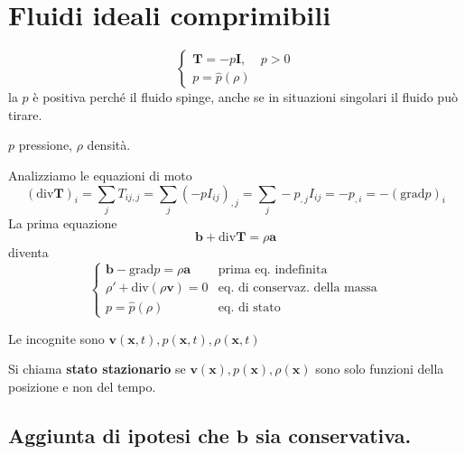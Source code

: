 \documentclass[10pt,a4paper,twoside]{book}
\begin{document}
\section{Fluidi ideali comprimibili}
\begin{equation*}
\boxed{\begin{cases}
\mathbf{T} =-p\mathbf{I} , & p >0\\
p=\hat{p}( \rho ) & 
\end{cases}}
\end{equation*}
la $p$ è positiva perché il fluido spinge, anche se in situazioni singolari il fluido può tirare.

$p$ pressione, $\rho $ densità.



Analizziamo le equazioni di moto
\begin{equation*}
(\mathrm{div}\mathbf{T})_{i} =\sum _{j} T_{ij,j} =\sum _{j}( -pI_{ij})_{,j} =\sum _{j} -p_{,j} I_{ij} =-p_{,i} =-(\mathrm{grad} p)_{i}
\end{equation*}
La prima equazione
\begin{equation*}
\mathbf{b} +\mathrm{div}\mathbf{T} =\rho \mathbf{a}
\end{equation*}
diventa
\begin{equation*}
\begin{cases}
\mathbf{b} -\mathrm{grad} p=\rho \mathbf{a} & \text{prima eq. indefinita}\\
\rho '+\mathrm{div}( \rho \mathbf{v}) =0 & \text{eq. di conservaz. della massa}\\
p=\hat{p}( \rho ) & \text{eq. di stato}
\end{cases}
\end{equation*}


Le incognite sono $\mathbf{v}(\mathbf{x} ,t) ,p(\mathbf{x} ,t) ,\rho (\mathbf{x} ,t)$

Si chiama \textbf{stato stazionario} se $\mathbf{v}(\mathbf{x}) ,p(\mathbf{x}) ,\rho (\mathbf{x})$ sono solo funzioni della posizione e non del tempo.
\subsection{Aggiunta di ipotesi che $\mathbf{b}$ sia conservativa.}
\end{document}
